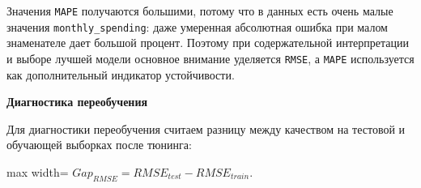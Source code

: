 \documentclass[11pt]{article}
\begin{document}
Значения \texttt{MAPE} получаются большими, потому что в данных есть
очень малые значения \texttt{monthly\_spending}: даже умеренная
абсолютная ошибка при малом знаменателе дает большой процент. Поэтому
при содержательной интерпретации и выборе лучшей модели основное
внимание уделяется \texttt{RMSE}, а \texttt{MAPE} используется как
дополнительный индикатор устойчивости.

    \textbf{Диагностика переобучения}

Для диагностики переобучения считаем разницу между качеством на тестовой
и обучающей выборках после тюнинга:

\begin{center}
\begin{adjustbox}{max width=\linewidth}
\(\displaystyle Gap_{RMSE} = RMSE_{test} - RMSE_{train}.\)
\end{adjustbox}
\end{center}
\end{document}
